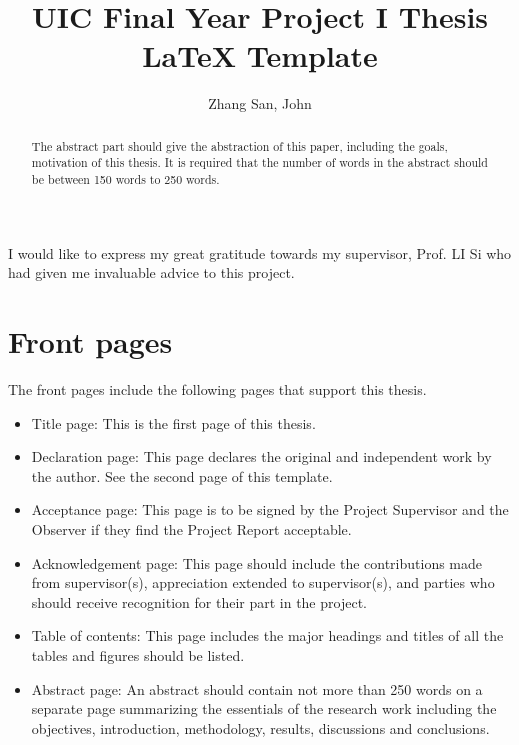 \documentclass[12pt]{article}
\title{UIC Final Year Project I Thesis \LaTeX{} Template}
\author{Zhang San, John}
\begin{document}
\maketitle
\thispagestyle{empty}
\newpage
\clearpage{}
\setcounter{page}{2}

\newpage

\begin{acknowledgement}
    I would like to express my great gratitude towards my supervisor, Prof. LI Si who had given me invaluable advice to this project.
\end{acknowledgement}

\clearpage{}
\newpage
\clearpage{}
\setcounter{page}{1} %
\maketitle
\thispagestyle{empty}
\newpage
{}
\begin{abstract}
    The abstract part should give the abstraction of this paper, including the goals, motivation of this thesis. It is required that the number of words in the abstract should be between 150 words to 250 words.
\end{abstract}
\newpage
\tableofcontents{}
\newpage
\section{Front pages}
The front pages include the following pages that support this thesis. 
\begin{itemize}
    \item Title page: This is the first page of this thesis.
    \item Declaration page: This page declares the original and independent work by the author. See the second page of this template.
    \item Acceptance page: This page is to be signed by the Project Supervisor and the Observer if they find the Project Report acceptable. 
    \item Acknowledgement page: This page should include the contributions made from supervisor(s), appreciation extended to supervisor(s), and parties who should receive recognition for their part in the project. 
    \item Table of contents: This page includes the major headings and titles of all the tables and figures should be listed. 
    \item Abstract page: An abstract should contain not more than 250 words on a separate page summarizing the essentials of the research work including the objectives, introduction, methodology, results, discussions and conclusions. 
\end{itemize}
\end{document}
